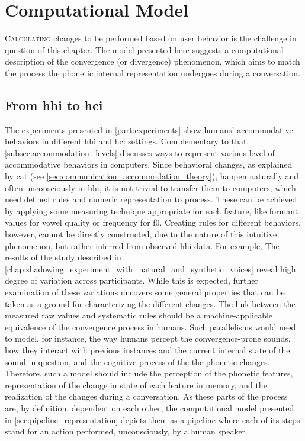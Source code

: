 \chapter[Computational Model]{Computational Model}
\label{chap:computational_model}

\lettrine{C}{alculating} changes to be performed based on user behavior is the challenge in question of this chapter.
The model presented here suggests a computational description of the convergence (or divergence) phenomenon, which aims to match the process the phonetic internal representation undergoes during a conversation.

\pagebreak

\section{From \acs{hhi} to \acs{hci}}
\label{sec:from_hhi_to_hci}

The experiments presented in \cref{part:experiments} show humans' accommodative behaviors in different \ac{hhi} and \ac{hci} settings.
Complementary to that, \cref{subsec:accommodation_levels} discusses ways to represent various level of accommodative behaviors in computers.
Since behavioral changes, as explained by \ac{cat} (see \cref{sec:communication_accommodation_theory}), happen naturally and often unconsciously in \ac{hhi}, it is not trivial to transfer them to computers, which need defined rules and numeric representation to process.
These can be achieved by applying some measuring technique appropriate for each feature, like formant values for vowel quality or frequency for \ac{f0}.
Creating rules for different behaviors, however, cannot be directly constructed, due to the nature of this intuitive phenomenon, but rather inferred from observed \ac{hhi} data.
For example, The results of the study described in \cref{chap:shadowing_experiment_with_natural_and_synthetic_voices} reveal high degree of variation across participants.
While this is expected, further examination of these variations uncovers some general properties that can be taken as a ground for characterizing the different changes.
The link between the measured raw values and systematic rules should be a machine-applicable equivalence of the convergence process in humans.
Such parallelisms would need to model, for instance, the way humans percept the convergence-prone sounds, how they interact with previous instances and the current internal state of the sound in question, and the cognitive process of the the phonetic changes.
Therefore, such a model should include the perception of the phonetic features, representation of the change in state of each feature in memory, and the realization of the changes during a conversation.
As these parts of the process are, by definition, dependent on each other, the computational model presented in \cref{sec:pipeline_representation} depicts them as a pipeline where each of its steps stand for an action performed, unconsciously, by a human speaker.

